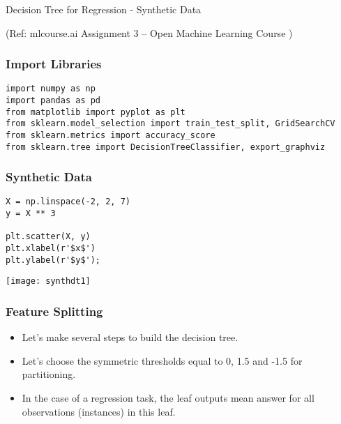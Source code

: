 \begin{frame}[fragile]\frametitle{}
\begin{center}
{\Large Decision Tree for Regression - Synthetic Data}

{\tiny (Ref: mlcourse.ai Assignment 3 – Open Machine Learning Course ) }
\end{center}

\end{frame}

\begin{frame}[fragile]\frametitle{Import Libraries}
\begin{lstlisting}
import numpy as np
import pandas as pd
from matplotlib import pyplot as plt
from sklearn.model_selection import train_test_split, GridSearchCV
from sklearn.metrics import accuracy_score
from sklearn.tree import DecisionTreeClassifier, export_graphviz
\end{lstlisting}

\end{frame}

\begin{frame}[fragile]\frametitle{Synthetic Data}	
\begin{lstlisting}
X = np.linspace(-2, 2, 7)
y = X ** 3

plt.scatter(X, y)
plt.xlabel(r'$x$')
plt.ylabel(r'$y$');		 
\end{lstlisting}
\begin{center}
\texttt{[image: synthdt1]}
\end{center}
\end{frame}

\begin{frame}[fragile]\frametitle{Feature Splitting}	
\begin{itemize}
\item Let's make several steps to build the decision tree. 
\item Let's choose the symmetric thresholds equal to 0, 1.5 and -1.5 for partitioning. 
\item In the case of a regression task, the leaf outputs mean answer for all observations (instances) in this leaf.
\end{itemize}
\end{frame}


